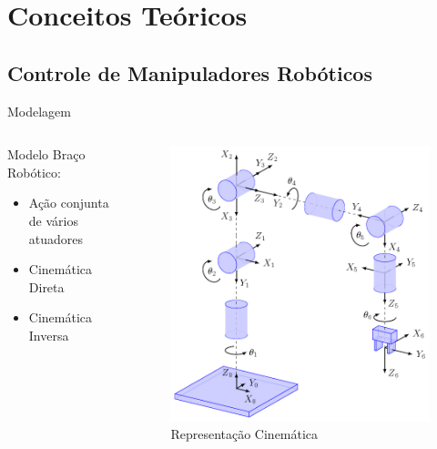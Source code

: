 \documentclass{beamer}
\begin{document}
\section{Conceitos Teóricos}
\subsection{Controle de Manipuladores Robóticos}

\begin{frame}{Modelagem}

\begin{columns}
\begin{column}{0.4\textwidth}  %
Modelo Braço Robótico:
\begin{itemize}
    \item Ação conjunta de vários atuadores
    \item Cinemática Direta
    \item Cinemática Inversa
\end{itemize}
\end{column}
\begin{column}{0.6\textwidth}
\begin{figure}
    \centering
    \includegraphics[width = 0.8\linewidth]{tex/figs/robotkine.png}
    \caption{Representação Cinemática}
    \label{fig:mekainside}
\end{figure}
\end{column}
\end{columns}
\end{frame}
\end{document}
